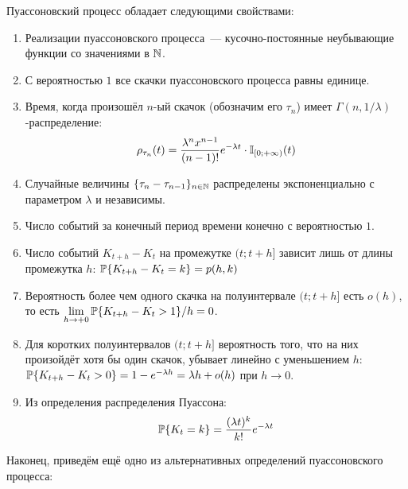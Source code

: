\begin{statement}
    \label{statement:special:Poisson_process_properties}
    Пуассоновский процесс обладает следующими свойствами:
    \begin{enumerate}
        \item
            Реализации пуассоновского процесса~--- кусочно-постоянные неубывающие функции со значениями в $ \mathbb{N} $.
        \item
            С вероятностью $ 1 $ все скачки пуассоновского процесса равны единице.
        \item
            Время, когда произошёл $ n $-ый скачок (обозначим его $ \tau_n $) имеет $ \Gamma(n, 1/\lambda) $-распределение:
            \[
                \rho_{\tau_n}(t) = \frac{\lambda^n x^{n-1}}{(n-1)!} e^{-\lambda t} \cdot \mathbb{I}_{[0;+\infty)}(t)
            \]
        \item
            Случайные величины $ \{\tau_{n} - \tau_{n-1}\}_{n \in \mathbb{N}} $ распределены экспоненциально с параметром $ \lambda $ и независимы.
        \item
            Число событий за конечный период времени конечно с вероятностью $ 1 $.
        \item
            Число событий $ K_{t+h} - K_t $ на промежутке $ (t; t+h] $ зависит лишь от длины промежутка $ h $:
            $ \mathbb{P} \{ K_{t + h} - K_t = k \} = p(h, k) $
        \item
            Вероятность более чем одного скачка на полуинтервале $ (t; t + h] $ есть $ o(h) $,
            то есть $ \displaystyle \lim_{h \to +0} \mathbb{P} \{ K_{t+h} - K_t > 1 \} / h = 0 $.
        \item
            Для коротких полуинтервалов $ (t; t+h] $ вероятность того, что на них произойдёт хотя бы один скачок,
            убывает линейно с уменьшением $ h $: $ \mathbb{P} \{ K_{t+h} - K_t > 0 \} = 1 - e^{-\lambda h} = \lambda h + o(h) $ при $ h \to 0 $.
        \item
            Из определения распределения Пуассона:
            \[
                \mathbb{P}\{K_t = k\} = \frac{(\lambda t)^k}{k!} e^{-\lambda t}
            \]
    \end{enumerate}
\end{statement}

Наконец, приведём ещё одно из альтернативных определений пуассоновского процесса:

